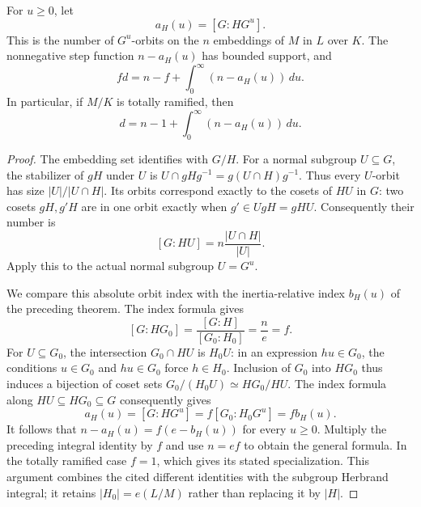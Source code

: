 \begin{theorem}
\label{fw:subextension-different-orbit-integral}
\leanok
For $u\geq0$, let
\[
 a_H(u)=[G:HG^u].
\]
This is the number of $G^u$-orbits on the $n$ embeddings of $M$ in
$L$ over $K$. The nonnegative step function $n-a_H(u)$ has bounded
support, and
\[
 f d=n-f+\int_0^\infty(n-a_H(u))\,du.
\]
In particular, if $M/K$ is totally ramified, then
\[
 d=n-1+\int_0^\infty(n-a_H(u))\,du.
\]
\end{theorem}
\begin{proof}
The embedding set identifies with $G/H$. For a normal subgroup
$U\subseteq G$, the stabilizer of $gH$ under $U$ is
$U\cap gHg^{-1}=g(U\cap H)g^{-1}$. Thus every $U$-orbit has size
$|U|/|U\cap H|$. Its orbits correspond exactly to the cosets of
$HU$ in $G$: two cosets $gH,g'H$ are in one orbit exactly when
$g'\in UgH=gHU$. Consequently their number is
\[
 [G:HU]=n\frac{|U\cap H|}{|U|}.
\]
Apply this to the actual normal subgroup $U=G^u$.

We compare this absolute orbit index with the inertia-relative index
$b_H(u)$ of the preceding theorem. The index formula gives
\[
 [G:HG_0]=\frac{[G:H]}{[G_0:H_0]}=\frac ne=f.
\]
For $U\subseteq G_0$, the intersection $G_0\cap HU$ is $H_0U$:
in an expression $hu\in G_0$, the conditions $u\in G_0$ and
$hu\in G_0$ force $h\in H_0$. Inclusion of $G_0$ into $HG_0$
thus induces a bijection of coset sets
$G_0/(H_0U)\simeq HG_0/HU$. The index formula along
$HU\subseteq HG_0\subseteq G$ consequently gives
\[
 a_H(u)=[G:HG^u]=f[G_0:H_0G^u]=f b_H(u).
\]
It follows that $n-a_H(u)=f(e-b_H(u))$ for every $u\geq0$.
Multiply the preceding integral identity by $f$ and use $n=ef$ to
obtain the general formula. In the totally ramified case $f=1$,
which gives its stated specialization. This argument combines the
cited different identities with the subgroup Herbrand integral;
it retains $|H_0|=e(L/M)$ rather than replacing it by $|H|$.
\end{proof}

